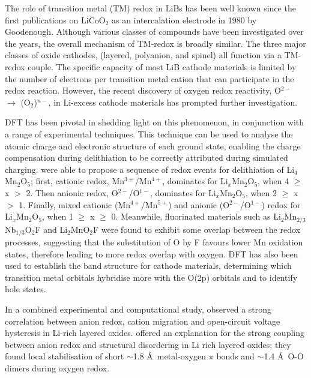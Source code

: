 \documentclass[../main.tex]{subfiles}
\begin{document}
The role of transition metal (TM) redox in LiBs has been well known since the first publications on LiCoO$_2$ as an intercalation electrode in 1980 by Goodenough.\cite{mizushima1980lixcoo2} Although various classes of compounds have been investigated over the years, the overall mechanism of TM-redox is broadly similar. The three major classes of oxide cathodes, (layered,\cite{mizushima1980lixcoo2} polyanion,\cite{padhi1997olivine} and spinel\cite{Thackeray1983}) all function via a TM-redox couple. The specific capacity of most LiB cathode materials is limited by the number of electrons per transition metal cation that can participate in the redox reaction. However, the recent discovery of oxygen redox reactivity, O$^{2-}$ $\to$ (O$_2$)$^{n-}$,  in Li-excess cathode materials\cite{Koga2013, Sathiya2013, Oishi2015, Sathiya2015, McCalla2015, Cao2015, Shimoda2016, Chen2016, Luo2016a, Hy2016, Muhammad2016, Seo2016, Gent2017, Zhan2017,  Zheng2017,Assat2018, BenYahia2019, naylor2019depth, Hua2019, House2020, Li2019, Eum2020, Gent2020, Sharpe2020} has prompted further investigation.

DFT has been pivotal in shedding light on this phenomenon, in conjunction with a range of experimental techniques. This technique can be used to analyse the atomic charge and electronic structure of each ground state, enabling the charge compensation during delithiation to be correctly attributed during simulated charging. \citeauthor{Yao2018} were able to propose a sequence of redox events for delithiation of Li$_4$Mn$_2$O$_5$;\cite{Yao2018} first, cationic redox, Mn$^{3+}$/Mn$^{4+}$, dominates for Li$_x$Mn$_2$O$_5$, when 4 $\geq$ x $>$ 2. Then anionic redox, O$^{2-}$/O$^{1-}$, dominates for Li$_x$Mn$_2$O$_5$, when 2 $\geq$ x $>$ 1. Finally, mixed cationic (Mn$^{4+}$/Mn$^{5+}$) and anionic (O$^{2-}$/O$^{1-}$) redox for Li$_x$Mn$_2$O$_5$, when 1 $\geq$ x $\geq$ 0. Meanwhile, fluorinated materials such as Li$_2$Mn$_{2/3}$Nb$_{1/3}$O$_2$F\cite{Lee2018} and Li$_2$MnO$_2$F\cite{Sharpe2020} were found to exhibit some overlap between the redox processes, suggesting that the substitution of O by F favours lower Mn oxidation states, therefore leading to more redox overlap with oxygen. DFT has also been used to establish the band structure for cathode materials, determining which transition metal orbitals hybridise more with the O(2p) orbitals\cite{Cao2015, Sathiya2013a} and to identify hole states.\cite{Zhan2017, Xiao2012}

In a combined experimental and computational study, \citeauthor{Gent2017} observed a strong correlation between anion redox, cation migration and open-circuit voltage hysteresis in Li-rich layered oxides.\cite{Gent2017} \citeauthor{Hong2019} offered an explanation for the strong coupling between anion redox and structural disordering in Li rich layered oxides; they found local stabilisation of short $\sim$1.8 \AA \ metal-oxygen $\pi$ bonds and $\sim$1.4 \AA \ O-O dimers during oxygen redox.\cite{Hong2019}
\end{document}
